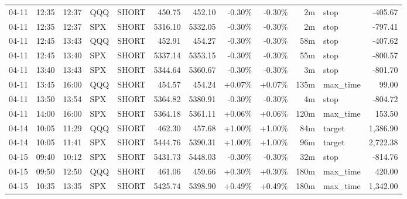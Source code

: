 \documentclass[11pt,a4paper,twoside]{article}
\begin{document}
\begin{center}
\begin{longtable}{>{\color{txtmain}}l l l l l r r r r r >{\color{txtmain}}l r}
04-11 & 12:35 & 12:37 & QQQ & SHORT & 450.75 & 452.10 & \textcolor{lossred}{-0.30\%} & \textcolor{lossred}{-0.30\%} & 2m & stop & \textcolor{lossred}{-405.67} \\
04-11 & 12:35 & 12:37 & SPX & SHORT & 5316.10 & 5332.05 & \textcolor{lossred}{-0.30\%} & \textcolor{lossred}{-0.30\%} & 2m & stop & \textcolor{lossred}{-797.41} \\
04-11 & 12:45 & 13:43 & QQQ & SHORT & 452.91 & 454.27 & \textcolor{lossred}{-0.30\%} & \textcolor{lossred}{-0.30\%} & 58m & stop & \textcolor{lossred}{-407.62} \\
04-11 & 12:45 & 13:40 & SPX & SHORT & 5337.14 & 5353.15 & \textcolor{lossred}{-0.30\%} & \textcolor{lossred}{-0.30\%} & 55m & stop & \textcolor{lossred}{-800.57} \\
04-11 & 13:40 & 13:43 & SPX & SHORT & 5344.64 & 5360.67 & \textcolor{lossred}{-0.30\%} & \textcolor{lossred}{-0.30\%} & 3m & stop & \textcolor{lossred}{-801.70} \\
04-11 & 13:45 & 16:00 & QQQ & SHORT & 454.57 & 454.24 & \textcolor{wingreen}{+0.07\%} & \textcolor{wingreen}{+0.07\%} & 135m & max\_time & \textcolor{wingreen}{99.00} \\
04-11 & 13:50 & 13:54 & SPX & SHORT & 5364.82 & 5380.91 & \textcolor{lossred}{-0.30\%} & \textcolor{lossred}{-0.30\%} & 4m & stop & \textcolor{lossred}{-804.72} \\
04-11 & 14:00 & 16:00 & SPX & SHORT & 5364.18 & 5361.11 & \textcolor{wingreen}{+0.06\%} & \textcolor{wingreen}{+0.06\%} & 120m & max\_time & \textcolor{wingreen}{153.50} \\
04-14 & 10:05 & 11:29 & QQQ & SHORT & 462.30 & 457.68 & \textcolor{wingreen}{+1.00\%} & \textcolor{wingreen}{+1.00\%} & 84m & target & \textcolor{wingreen}{1,386.90} \\
04-14 & 10:05 & 11:41 & SPX & SHORT & 5444.76 & 5390.31 & \textcolor{wingreen}{+1.00\%} & \textcolor{wingreen}{+1.00\%} & 96m & target & \textcolor{wingreen}{2,722.38} \\
04-15 & 09:40 & 10:12 & SPX & SHORT & 5431.73 & 5448.03 & \textcolor{lossred}{-0.30\%} & \textcolor{lossred}{-0.30\%} & 32m & stop & \textcolor{lossred}{-814.76} \\
04-15 & 09:50 & 12:50 & QQQ & SHORT & 461.06 & 459.66 & \textcolor{wingreen}{+0.30\%} & \textcolor{wingreen}{+0.30\%} & 180m & max\_time & \textcolor{wingreen}{420.00} \\
04-15 & 10:35 & 13:35 & SPX & SHORT & 5425.74 & 5398.90 & \textcolor{wingreen}{+0.49\%} & \textcolor{wingreen}{+0.49\%} & 180m & max\_time & \textcolor{wingreen}{1,342.00} \\

\end{longtable}
\end{center}
\end{document}
